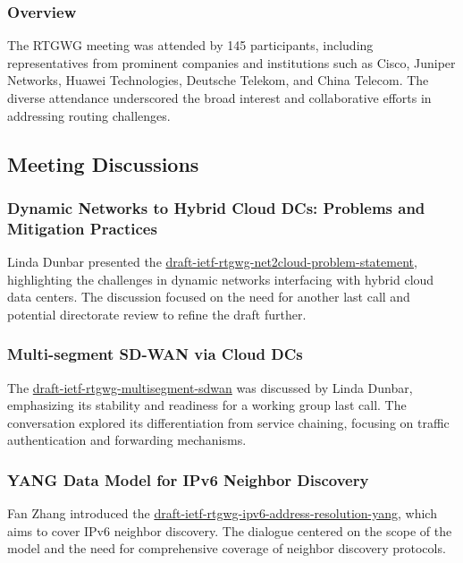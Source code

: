 \documentclass{article}
\begin{document}
\subsubsection{Overview}
The RTGWG meeting was attended by 145 participants, including representatives from prominent companies and institutions such as Cisco, Juniper Networks, Huawei Technologies, Deutsche Telekom, and China Telecom. The diverse attendance underscored the broad interest and collaborative efforts in addressing routing challenges.

\subsection{Meeting Discussions}

\subsubsection{Dynamic Networks to Hybrid Cloud DCs: Problems and Mitigation Practices}
Linda Dunbar presented the \href{https://datatracker.ietf.org/doc/html/draft-ietf-rtgwg-net2cloud-problem-statement}{draft-ietf-rtgwg-net2cloud-problem-statement}, highlighting the challenges in dynamic networks interfacing with hybrid cloud data centers. The discussion focused on the need for another last call and potential directorate review to refine the draft further.

\subsubsection{Multi-segment SD-WAN via Cloud DCs}
The \href{https://datatracker.ietf.org/doc/html/draft-ietf-rtgwg-multisegment-sdwan}{draft-ietf-rtgwg-multisegment-sdwan} was discussed by Linda Dunbar, emphasizing its stability and readiness for a working group last call. The conversation explored its differentiation from service chaining, focusing on traffic authentication and forwarding mechanisms.

\subsubsection{YANG Data Model for IPv6 Neighbor Discovery}
Fan Zhang introduced the \href{https://datatracker.ietf.org/doc/html/draft-ietf-rtgwg-ipv6-address-resolution-yang}{draft-ietf-rtgwg-ipv6-address-resolution-yang}, which aims to cover IPv6 neighbor discovery. The dialogue centered on the scope of the model and the need for comprehensive coverage of neighbor discovery protocols.
\end{document}
